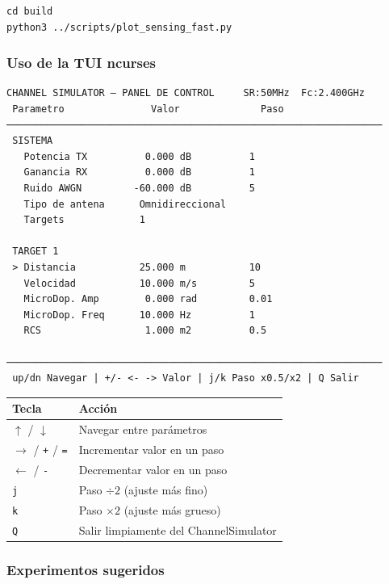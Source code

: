 \documentclass[11pt,a4paper]{article}
\begin{document}
\begin{lstlisting}[style=bash]
cd build
python3 ../scripts/plot_sensing_fast.py
\end{lstlisting}

\subsubsection{Uso de la TUI ncurses}

\begin{center}
\begin{lstlisting}[style=plain]
 CHANNEL SIMULATOR — PANEL DE CONTROL     SR:50MHz  Fc:2.400GHz
 Parametro               Valor              Paso
─────────────────────────────────────────────────────────────────
 SISTEMA
   Potencia TX          0.000 dB          1
   Ganancia RX          0.000 dB          1
   Ruido AWGN         -60.000 dB          5
   Tipo de antena      Omnidireccional
   Targets             1

 TARGET 1
 > Distancia           25.000 m           10
   Velocidad           10.000 m/s         5
   MicroDop. Amp        0.000 rad         0.01
   MicroDop. Freq      10.000 Hz          1
   RCS                  1.000 m2          0.5

─────────────────────────────────────────────────────────────────
 up/dn Navegar | +/- <- -> Valor | j/k Paso x0.5/x2 | Q Salir
\end{lstlisting}
\end{center}

\begin{center}
\begin{tabularx}{0.85\linewidth}{lX}
\toprule
\textbf{Tecla} & \textbf{Acción} \\
\midrule
$\uparrow$ / $\downarrow$ & Navegar entre parámetros \\
$\rightarrow$ / \texttt{+} / \texttt{=} & Incrementar valor en un paso \\
$\leftarrow$ / \texttt{-} & Decrementar valor en un paso \\
\texttt{j} & Paso $\div 2$ (ajuste más fino) \\
\texttt{k} & Paso $\times 2$ (ajuste más grueso) \\
\texttt{Q} & Salir limpiamente del ChannelSimulator \\
\bottomrule
\end{tabularx}
\end{center}

\subsubsection{Experimentos sugeridos}
\end{document}

